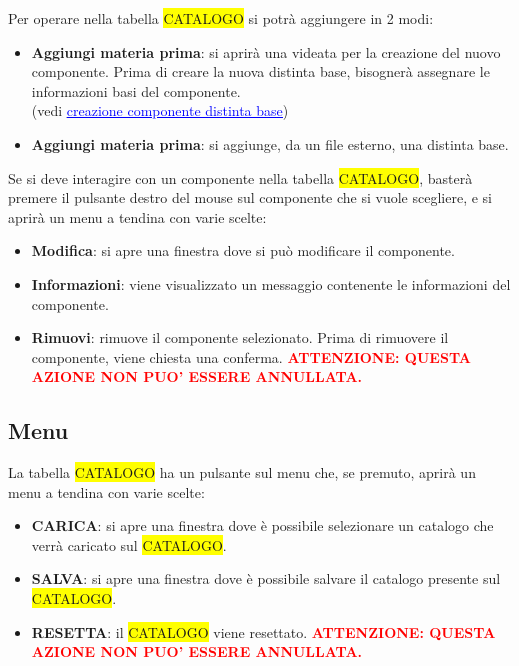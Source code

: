 \documentclass[12pt,twoside]{report}
\newcommand{\coloredbold}[2]{\textcolor{#1}{\textbf{#2}}}
\begin{document}
Per operare nella tabella \colorbox{yellow}{CATALOGO} si potrà aggiungere in 2 modi:

\begin{itemize}
	
	\item \textbf{Aggiungi materia prima}: si aprirà una videata per la creazione del nuovo componente. Prima di creare la nuova distinta base, bisognerà assegnare le informazioni basi del componente. \\(vedi \hyperlink{CompDistintaBase}{\textcolor{blue}{\underline{creazione componente distinta base}}})
	\item \textbf{Aggiungi materia prima}: si aggiunge, da un file esterno, una distinta base.
	      
\end{itemize}

Se si deve interagire con un componente nella tabella \colorbox{yellow}{CATALOGO}, basterà premere il pulsante destro del mouse sul componente che si vuole scegliere, e si aprirà un menu a tendina con varie scelte:

\begin{itemize}
	
	\item \textbf{Modifica}: si apre una finestra dove si può modificare il componente.
	\item \textbf{Informazioni}: viene visualizzato un messaggio contenente le informazioni del componente.
	\item \textbf{Rimuovi}: rimuove il componente selezionato. Prima di rimuovere il componente, viene chiesta una conferma. \coloredbold{red}{ATTENZIONE: QUESTA AZIONE NON PUO’ ESSERE ANNULLATA.}	
	      	          
\end{itemize}


\subsection{Menu}

La tabella \colorbox{yellow}{CATALOGO} ha un pulsante sul menu che, se premuto, aprirà un menu a tendina con varie scelte:

\begin{itemize}
	
	\item \textbf{CARICA}: si apre una finestra dove è possibile selezionare un catalogo che verrà caricato sul \colorbox{yellow}{CATALOGO}.
	\item \textbf{SALVA}: si apre una finestra dove è possibile salvare il catalogo presente sul \colorbox{yellow}{CATALOGO}.
	\item \textbf{RESETTA}: il \colorbox{yellow}{CATALOGO} viene resettato. 
	      \coloredbold{red}{ATTENZIONE: QUESTA AZIONE NON PUO’ ESSERE ANNULLATA.}
	      	
\end{itemize}
\end{document}

